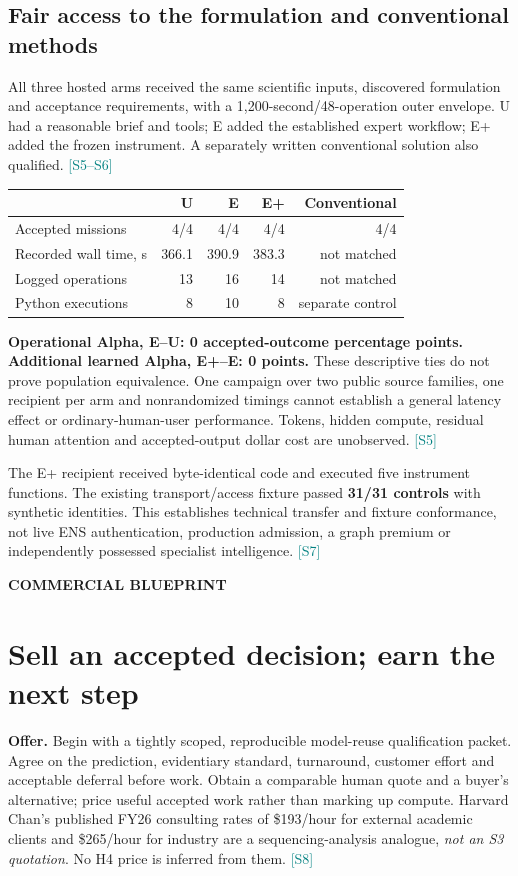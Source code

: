 \documentclass[11pt,letterpaper]{article}
\newcommand{\src}[1]{\textcolor{Teal}{\scriptsize[#1]}}
\newcommand{\eyebrow}[1]{{\small\bfseries\color{Gold}\MakeUppercase{#1}}\par}
\newcommand{\pagename}[2]{\eyebrow{#1}\section*{#2}}
\newcommand{\SUWall}{366.1}
\newcommand{\SUOps}{13}
\newcommand{\SURuns}{8}
\newcommand{\SEWall}{390.9}
\newcommand{\SEOps}{16}
\newcommand{\SERuns}{10}
\newcommand{\SPlusWall}{383.3}
\newcommand{\SPlusOps}{14}
\newcommand{\SPlusRuns}{8}
\begin{document}
\subsection*{Fair access to the formulation and conventional methods}
All three hosted arms received the same scientific inputs, discovered formulation and acceptance requirements, with a 1,200-second/48-operation outer envelope. U had a reasonable brief and tools; E added the established expert workflow; E+ added the frozen instrument. A separately written conventional solution also qualified. \src{S5--S6}

\begin{center}
\begin{tabular}{@{}lrrrr@{}}
\toprule
 & \textbf{U} & \textbf{E} & \textbf{E+} & \textbf{Conventional} \\
\midrule
Accepted missions & 4/4 & 4/4 & 4/4 & 4/4 \\
Recorded wall time, s & \SUWall & \SEWall & \SPlusWall & not matched \\
Logged operations & \SUOps & \SEOps & \SPlusOps & not matched \\
Python executions & \SURuns & \SERuns & \SPlusRuns & separate control \\
\bottomrule
\end{tabular}
\end{center}

\textbf{Operational Alpha, E--U: 0 accepted-outcome percentage points. Additional learned Alpha, E+--E: 0 points.} These descriptive ties do not prove population equivalence. One campaign over two public source families, one recipient per arm and nonrandomized timings cannot establish a general latency effect or ordinary-human-user performance. Tokens, hidden compute, residual human attention and accepted-output dollar cost are unobserved. \src{S5}

The E+ recipient received byte-identical code and executed five instrument functions. The existing transport/access fixture passed \textbf{31/31 controls} with synthetic identities. This establishes technical transfer and fixture conformance, not live ENS authentication, production admission, a graph premium or independently possessed specialist intelligence. \src{S7}

\newpage
\pagename{Commercial blueprint}{Sell an accepted decision; earn the next step}

\textbf{Offer.} Begin with a tightly scoped, reproducible model-reuse qualification packet. Agree on the prediction, evidentiary standard, turnaround, customer effort and acceptable deferral before work. Obtain a comparable human quote and a buyer's alternative; price useful accepted work rather than marking up compute. Harvard Chan's published FY26 consulting rates of \$193/hour for external academic clients and \$265/hour for industry are a sequencing-analysis analogue, \emph{not an S3 quotation}. No H4 price is inferred from them. \src{S8}
\end{document}
